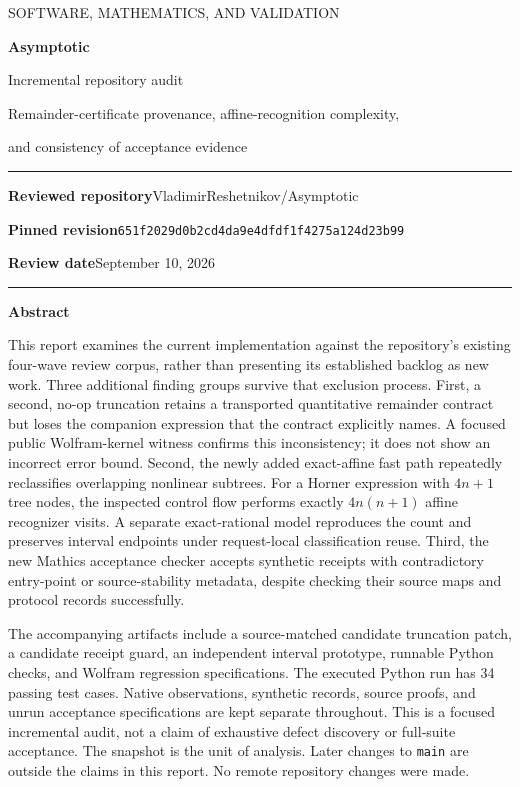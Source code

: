 \documentclass[11pt,letterpaper]{article}
\begin{document}
\begin{titlepage}
\thispagestyle{empty}
\vspace*{0.45in}
{\Large\textcolor{accent}{SOFTWARE, MATHEMATICS, AND VALIDATION}}\par
\vspace{0.22in}
{\Huge\bfseries\textcolor{ink}{Asymptotic}}\par
\vspace{0.08in}
{\LARGE Incremental repository audit}\par
\vspace{0.2in}
{\large Remainder-certificate provenance, affine-recognition complexity,\par
and consistency of acceptance evidence}\par
\vspace{0.32in}
\rule{\linewidth}{0.6pt}
\textbf{Reviewed repository}\quad VladimirReshetnikov/Asymptotic\par
\textbf{Pinned revision}\quad\texttt{651f2029d0b2cd4da9e4dfdf1f4275a124d23b99}\par
\textbf{Review date}\quad September 10, 2026\par
\rule{\linewidth}{0.6pt}
\vspace{0.2in}
\textbf{Abstract}\par
This report examines the current implementation against the repository's existing
four-wave review corpus, rather than presenting its established backlog as new
work. Three additional finding groups survive that exclusion process. First, a
second, no-op truncation retains a transported quantitative remainder contract but
loses the companion expression that the contract explicitly names. A focused
public Wolfram-kernel witness confirms this inconsistency; it does not show an
incorrect error bound. Second, the newly added exact-affine fast path repeatedly
reclassifies overlapping nonlinear subtrees. For a Horner expression with
$4n+1$ tree nodes, the inspected control flow performs exactly $4n(n+1)$ affine
recognizer visits. A separate exact-rational model reproduces the count and
preserves interval endpoints under request-local classification reuse. Third,
the new Mathics acceptance checker accepts synthetic receipts with contradictory
entry-point or source-stability metadata, despite checking their source maps and
protocol records successfully.

The accompanying artifacts include a source-matched candidate truncation patch,
a candidate receipt guard, an independent interval prototype, runnable Python
checks, and Wolfram regression specifications. The executed Python run has 34
passing test cases. Native observations, synthetic records, source proofs, and
unrun acceptance specifications are kept separate throughout. This is a focused
incremental audit, not a claim of exhaustive defect discovery or full-suite
acceptance.
\vfill
{\small\textcolor{muted}{The snapshot is the unit of analysis. Later changes to
\texttt{main} are outside the claims in this report. No remote repository changes
were made.}}
\end{titlepage}
\end{document}
